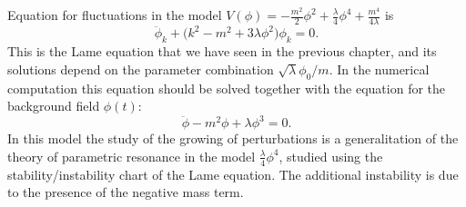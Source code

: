 \documentclass[11pt,a4paper,twoside]{book}
\begin{document}
Equation for fluctuations in the model $ V(\phi)=-\frac{m^{2}}{2}\phi^{2} + \frac{\lambda}{4}\phi^{4} + \frac{m^{4}}{4\lambda} $ is 
\begin{equation}
\label{Chap5:equationFluctuation}
\ddot{\phi}_{k} + \Bigg(k^{2} -m^{2} +3\lambda\phi^{2}\Bigg) \phi_{k} = 0.
\end{equation}
This is the Lame equation that we have seen in the previous chapter, and its solutions depend on the parameter combination $ \sqrt{\lambda}\phi_{0}/m  $.
In the numerical computation this equation should be solved together with the equation for the background field $\phi(t)$:
\begin{equation}
\label{Chap5:equationBackground}
\ddot{\phi} - m^{2}\phi + \lambda \phi^{3} = 0.
\end{equation}
In this model the study of the growing of  perturbations is a generalitation of the theory of parametric resonance in the model $ \frac{\lambda}{4}\phi^{4} $, studied using the stability/instability chart of the Lame equation. The additional instability is due to the presence of the negative mass term.
\end{document}

